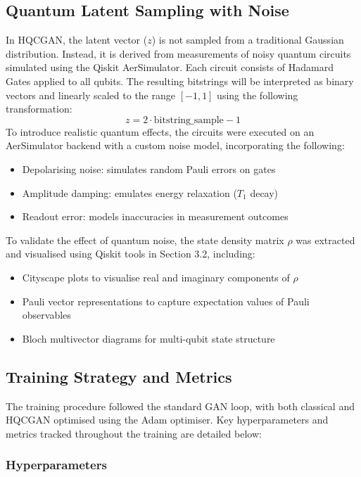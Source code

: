 \subsection{Quantum Latent Sampling with Noise}

In HQCGAN, the latent vector ($z$) is not sampled from a traditional Gaussian distribution. Instead, it is derived from measurements of noisy quantum circuits simulated using the Qiskit AerSimulator. Each circuit consists of Hadamard Gates applied to all qubits. The resulting bitstrings will be interpreted as binary vectors and linearly scaled to the range $[-1, 1]$ using the following transformation:
\begin{equation}
z = 2 \cdot \text{bitstring\_sample} - 1
\end{equation}
To introduce realistic quantum effects, the circuits were executed on an AerSimulator backend with a custom noise model, incorporating the following: 
\begin{itemize}
\item Depolarising noise: simulates random Pauli errors on gates
\item Amplitude damping: emulates energy relaxation ($T_1$ decay)
\item Readout error: models inaccuracies in measurement outcomes
\end{itemize}
To validate the effect of quantum noise, the state density matrix $\rho$ was extracted and visualised using Qiskit tools in Section 3.2, including:
\begin{itemize}
\item Cityscape plots to visualise real and imaginary components of $\rho$
\item Pauli vector representations to capture expectation values of Pauli observables
\item Bloch multivector diagrams for multi-qubit state structure
\end{itemize}

\subsection{Training Strategy and Metrics}

The training procedure followed the standard GAN loop, with both classical and HQCGAN optimised using the Adam optimiser. Key hyperparameters and metrics tracked throughout the training are detailed below:

\subsubsection{Hyperparameters}

